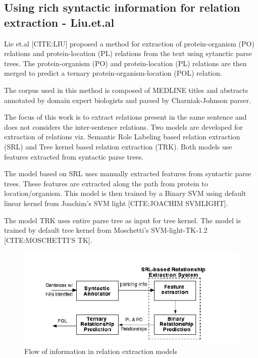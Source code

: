 \subsection*{Using rich syntactic information for relation extraction - Liu.et.al}

Lie et.al [CITE:LIU] proposed a method for extraction of protein-organism (PO) relations and protein-location (PL) relations from the text using sytanctic parse trees. The protein-organism (PO) and protein-location (PL) relations are then merged to predict a ternary protein-organism-location (POL) relation.

The corpus used in this method is composed of MEDLINE titles and abstracts annotated by domain expert biologists and parsed by Charniak-Johnson parser.

The focus of this work is to extract relations present in the same sentence and does not considers the inter-sentence relations. Two models are developed for extraction of relations viz. Semantic Role Labeling based relation extraction (SRL) and Tree kernel based relation extraction (TRK). Both models use features extracted from syntactic parse trees.

The model based on SRL uses manually extracted features from syntactic parse trees. These features are extracted along the path from protein to location/organism. This model is then trained by a Binary SVM using default linear kernel from Joachim’s SVM light [CITE:JOACHIM SVMLIGHT].

The model TRK uses entire parse tree as input for tree kernel. The model is trained by default tree kernel from Moschetti’s SVM-light-TK-1.2 [CITE:MOSCHETTI'S TK].

\begin{figure}[hbtp]
\includegraphics[scale=1]{figures/Liu_Flow.png}
\caption{Flow of information in relation extraction models }
\end{figure}



